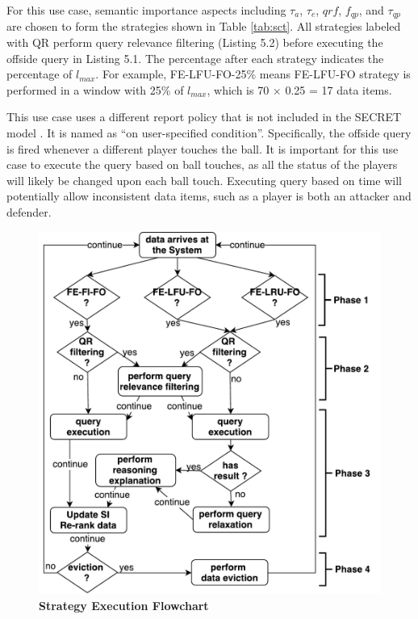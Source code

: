 For this use case, semantic importance aspects including $\tau_{a}$, $\tau_{e}$, $qrf$, $f_{qp}$, and $\tau_{qp}$ are chosen to form the strategies shown in Table \ref{tab:sct}. 
All strategies labeled with QR perform query relevance filtering (Listing 5.2) before executing the offside query in Listing 5.1. 
The percentage after each strategy indicates the percentage of $l_{max}$. 
For example, FE-LFU-FO-25\% means FE-LFU-FO strategy is performed in a window with 25\% of $l_{max}$, which is 70 $\times$ 0.25 = 17 data items.

This use case uses a different report policy that is not included in the SECRET model \cite{botan2010secret}.
It is named as ``on user-specified condition''. 
Specifically, the offside query is fired whenever a different player touches the ball.
It is important for this use case to execute the query based on ball touches, as all the status of the players will likely be changed upon each ball touch. 
Executing query based on time will potentially allow inconsistent data items, such as a player is both an attacker and defender. 

\begin{figure}[!htbp]
	\centering
	\includegraphics[width=5in]{img/5-strategyexe.pdf}
	\caption{\textbf{Strategy Execution Flowchart}}
	\label{fig:strExe}
\end{figure}

